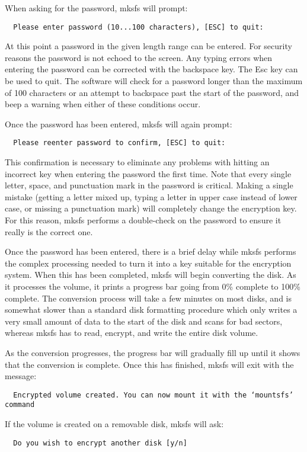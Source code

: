 When asking for the password, mksfs will prompt:

{\tt \verb|  |Please enter password (10...100 characters), [ESC] to quit:}

At this point a password in the given length range can be entered.  For
security reasons the password is not echoed to the screen.  Any typing errors
when entering the password can be corrected with the backspace key.  The Esc
key can be used to quit.  The software will check for a password longer than
the maximum of 100 characters or an attempt to backspace past the start of the
password, and beep a warning when either of these conditions occur.

Once the password has been entered, mksfs will again prompt:

{\tt \verb|  |Please reenter password to confirm, [ESC] to quit:}

This confirmation is necessary to eliminate any problems with hitting an
incorrect key when entering the password the first time.  Note that every
single letter, space, and punctuation mark in the password is critical.  Making
a single mistake (getting a letter mixed up, typing a letter in upper case
instead of lower case, or missing a punctuation mark) will completely change
the encryption key.  For this reason, mksfs performs a double-check on the
password to ensure it really is the correct one.

Once the password has been entered, there is a brief delay while mksfs performs
the complex processing needed to turn it into a key suitable for the encryption
system.  When this has been completed, mksfs will begin converting the disk.
As it processes the volume, it prints a progress bar going from 0\% complete to
100\% complete.  The conversion process will take a few minutes on most disks,
and is somewhat slower than a standard disk formatting procedure which only
writes a very small amount of data to the start of the disk and scans for bad
sectors, whereas mksfs has to read, encrypt, and write the entire disk volume.

As the conversion progresses, the progress bar will gradually fill up until it
shows that the conversion is complete.  Once this has finished, mksfs will exit
with the message:

{\small \tt \verb|  |Encrypted volume created.~You can now mount it with the `mountsfs' command}

If the volume is created on a removable disk, mksfs will ask:

{\tt \verb|  |Do you wish to encrypt another disk [y/n]}

